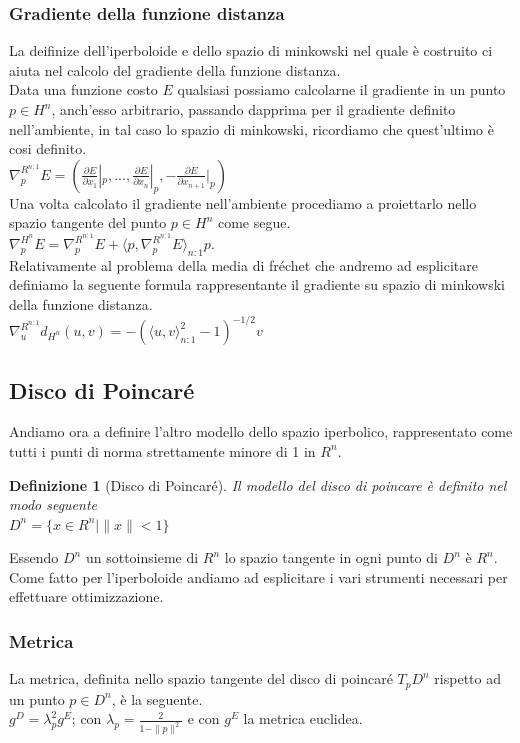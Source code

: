 \documentclass[a4paper, 12pt]{article}
\newtheorem{definition}{Definizione}
\begin{document}
\subsubsection{Gradiente della funzione distanza}
La deifinize dell'iperboloide e dello spazio di minkowski nel quale è costruito ci aiuta nel calcolo del gradiente della funzione distanza.\\
Data una funzione costo $E$ qualsiasi possiamo calcolarne il gradiente in un punto $p \in H^n$, anch'esso arbitrario, passando dapprima per il gradiente definito nell'ambiente, in tal caso lo spazio di minkowski, ricordiamo che quest'ultimo è cosi definito.\\
$\nabla_{p}^{R^{n:1}} E = (\frac{\partial E}{\partial x_1}|_p, ..., \frac{\partial E}{\partial x_n}|_p, -\frac{\partial E}{\partial x_{n+1}}|_p)$\\
Una volta calcolato il gradiente nell'ambiente procediamo a proiettarlo nello spazio tangente del punto $p \in H^n$ come segue.\\
$\nabla_{p}^{H^n} E = \nabla_{p}^{R^{n:1}} E + \langle p, \nabla_{p}^{R^{n:1}} E \rangle_{n:1} p$.\\
Relativamente al problema della media di fréchet che andremo ad esplicitare definiamo la seguente formula rappresentante il gradiente su spazio di minkowski della funzione distanza.\\
$\nabla_u^{R^{n:1}} d_{H^n}(u,v) = - (\langle u,v \rangle_{n:1}^2 - 1)^{-1/2} v$
\subsection{Disco di Poincaré}
Andiamo ora a definire l'altro modello dello spazio iperbolico, rappresentato come tutti i punti di norma strettamente minore di 1 in $R^n$.
\begin{definition}[Disco di Poincaré]
Il modello del disco di poincare è definito nel modo seguente\\
$D^n = \{x \in R^n | \parallel x \parallel < 1\}$
\end{definition}
Essendo $D^n$ un sottoinsieme di $R^n$ lo spazio tangente in ogni punto di $D^n$ è $R^n$. Come fatto per l'iperboloide andiamo ad esplicitare i vari strumenti necessari per effettuare ottimizzazione.
\subsubsection{Metrica}
La metrica, definita nello spazio tangente del disco di poincaré $T_pD^n$ rispetto ad un punto $p \in D^n$, è la seguente.\\
$g^D = \lambda_p^2 g^E$; con $\lambda_p = \frac{2}{1- \parallel p \parallel^2}$ e con $g^E$ la metrica euclidea.
\end{document}
